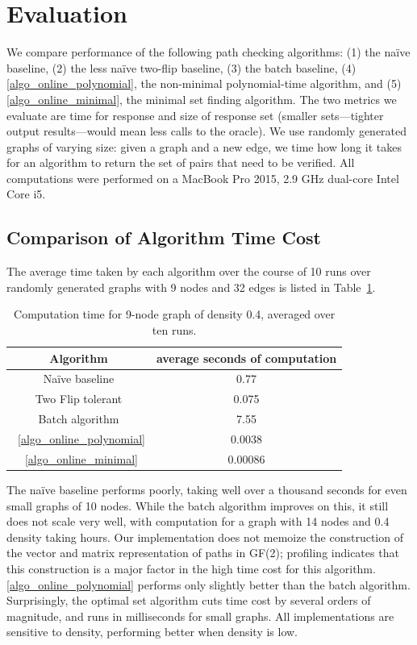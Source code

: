 \documentclass[sigplan]{acmart}
\begin{document}
\section{Evaluation}
\label{sec:evaluation}
We compare performance of the following path checking algorithms:
(1) the na\"{i}ve baseline,
(2) the less na\"{i}ve two-flip baseline,
(3) the batch baseline,
(4) \ref{algo_online_polynomial}, the non-minimal polynomial-time algorithm, and
(5) \ref{algo_online_minimal}, the minimal set finding algorithm.
The two metrics we evaluate are time for response and size of response set (smaller sets---tighter output results---would mean less calls to the oracle).
We use randomly generated graphs of varying size: given a graph and a new edge, we time how long it takes for an algorithm to return the set of pairs that need to be verified.
All computations were performed on a MacBook Pro 2015, 2.9 GHz dual-core Intel Core i5.

\subsection{Comparison of Algorithm Time Cost}
The average time taken by each algorithm over the course of 10 runs over randomly generated graphs with 9 nodes and 32 edges is listed in Table~\ref{tab:times}.

\begin{table}
    \caption{Computation time for 9-node graph of density 0.4, averaged over ten runs.}
\begin{tabular}{|c|c|}
    \hline
    Algorithm & average seconds of computation \\
    \hline
    Na\"{i}ve baseline & 0.77 \\
    Two Flip tolerant & 0.075 \\
    Batch algorithm & 7.55 \\
    ~\ref{algo_online_polynomial} & 0.0038 \\
    ~\ref{algo_online_minimal} & 0.00086 \\
    \hline
\end{tabular}
\label{tab:times} %
\end{table}
    
The na\"{i}ve baseline performs poorly, taking well over a thousand seconds for even small graphs of 10 nodes.
While the batch algorithm improves on this, it still does not scale very well, with computation for a graph with 14 nodes and 0.4 density taking hours.
Our implementation does not memoize the construction of the vector and matrix representation of paths in GF(2); profiling indicates that this construction is a major factor in the high time cost for this algorithm.
\ref{algo_online_polynomial} performs only slightly better than the batch algorithm.
Surprisingly, the optimal set algorithm cuts time cost by several orders of magnitude, and runs in milliseconds for small graphs.
All implementations are sensitive to density, performing better when density is low.
    
\end{document}
